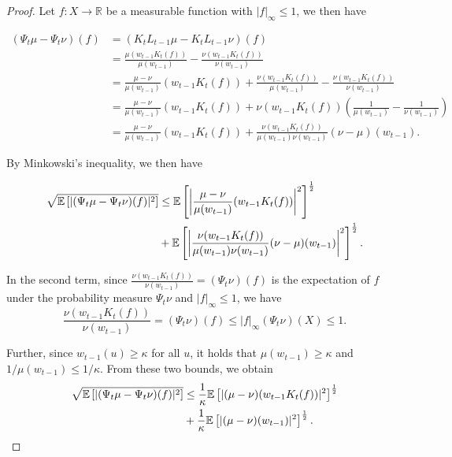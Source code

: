 \begin{proof}
  Let $f : X \rightarrow \mathbb{R}$ be a measurable function with $|f|_\infty \le 1$, we then have

  \begin{equation*}
    \begin{aligned}
      (\Psi_t\mu - \Psi_t\nu)(f)
      &= (K_tL_{t-1}\mu - K_tL_{t-1}\nu)(f) \\
      &= \frac{\mu(w_{t-1}K_t(f))}{\mu(w_{t-1})} - \frac{\nu(w_{t-1}K_t(f))}{\nu(w_{t-1})} \\
      &= \frac{\mu - \nu}{\mu(w_{t-1})}(w_{t-1}K_t(f)) + \frac{\nu(w_{t-1}K_t(f))}{\mu(w_{t-1})} - \frac{\nu(w_{t-1}K_t(f))}{\nu(w_{t-1})}\\
      &= \frac{\mu - \nu}{\mu(w_{t-1})}(w_{t-1}K_t(f)) + \nu(w_{t-1}K_t(f))\left(\frac1{\mu(w_{t-1})} - \frac1{\nu(w_{t-1})}\right)\\
      &= \frac{\mu - \nu}{\mu(w_{t-1})}(w_{t-1}K_t(f)) + \frac{ \nu(w_{t-1}K_t(f))}{\mu(w_{t-1})\nu(w_{t-1})}(\nu - \mu)(w_{t-1}).
    \end{aligned}
  \end{equation*}
  
  By Minkowski's inequality, we then have

  \begin{equation*}
    \begin{aligned}
      \sqrt{\mathbb{E}\left[|(\Psi_t\mu - \Psi_t\nu)(f)|^2\right]}
      &\leq \mathbb{E}\left[\left|\frac{\mu - \nu}{\mu(w_{t-1})}(w_{t-1}K_t(f))\right|^2\right]^{\frac12}\\
      &+ \mathbb{E}\left[\left|\frac{ \nu(w_{t-1}K_t(f))}{\mu(w_{t-1})\nu(w_{t-1})}(\nu - \mu)(w_{t-1})\right|^2\right]^{\frac12}      .
    \end{aligned}
  \end{equation*}


  In the second term, since $\frac{\nu(w_{t-1}K_t(f))}{\nu(w_{t-1})} = (\Psi_t \nu)(f)$ is the expectation of $f$ under the probability measure $\Psi_t\nu$ and $|f|_\infty \le 1$, we have
  \begin{equation*}
    \frac{\nu(w_{t-1}K_t(f))}{\nu(w_{t-1})} = (\Psi_t\nu)(f) \le |f|_\infty(\Psi_t\nu)(X) \le 1.
  \end{equation*}

  Further, since $w_{t-1}(u) \ge \kappa$ for all $u$, it holds that $\mu(w_{t-1}) \ge \kappa$ and $1 / \mu(w_{t-1}) \le 1/\kappa$. From these two bounds, we obtain
  \begin{equation*}
    \begin{aligned}
      \sqrt{\mathbb{E}\left[|(\Psi_t\mu - \Psi_t\nu)(f)|^2\right]}
      &\le \frac1\kappa\mathbb{E}\left[|(\mu - \nu)(w_{t-1}K_t(f))|^2\right]^{\frac12}\\
      &+ \frac1\kappa\mathbb{E}\left[|(\mu - \nu)(w_{t-1})|^2\right]^{\frac12}.
    \end{aligned}
  \end{equation*}



\end{proof}
